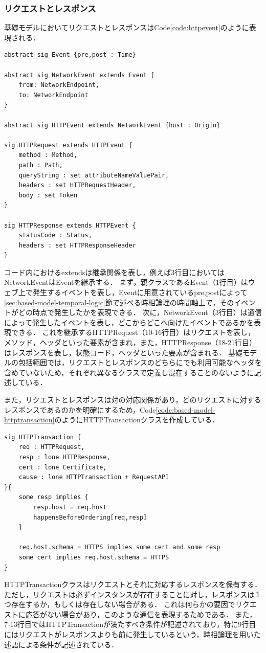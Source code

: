 \documentclass[12pt,a4paper]{jbook}
\begin{document}
\subsubsection{リクエストとレスポンス}
基礎モデルにおいてリクエストとレスポンスはCode\ref{code:httpevent}のように表現される．
\begin{lstlisting}[caption=リクエストとレスポンスを表現するクラス, label=code:httpevent]
abstract sig Event {pre,post : Time}

abstract sig NetworkEvent extends Event {
	from: NetworkEndpoint,
	to: NetworkEndpoint
}

abstract sig HTTPEvent extends NetworkEvent {host : Origin}

sig HTTPRequest extends HTTPEvent { 
	method : Method,
	path : Path,
	queryString : set attributeNameValuePair,
	headers : set HTTPRequestHeader,
	body : set Token
}

sig HTTPResponse extends HTTPEvent {
	statusCode : Status,
	headers : set HTTPResponseHeader
}
\end{lstlisting}
コード内におけるextendsは継承関係を表し，例えば3行目においてはNetworkEventはEventを継承する．
まず，親クラスであるEvent（1行目）はウェブ上で発生するイベントを表し，Eventに用意されているpre,postによって\ref{sec:based-model-temporal-logic}節で述べる時相論理の時間軸上で，そのイベントがどの時点で発生したかを表現できる．
次に，NetworkEvent（3行目）は通信によって発生したイベントを表し，どこからどこへ向けたイベントであるかを表現できる．
これを継承するHTTPRequest（10-16行目）はリクエストを表し，メソッド，ヘッダといった要素が含まれ，また，HTTPResponse（18-21行目）はレスポンスを表し，状態コード，ヘッダといった要素が含まれる．
基礎モデルの包括範囲では，リクエストとレスポンスのどちらにでも利用可能なヘッダを含めていないため，それぞれ異なるクラスで定義し混在することのないように記述している．

また，リクエストとレスポンスは対の対応関係があり，どのリクエストに対するレスポンスであるのかを明確にするため，Code\ref{code:based-model-httptransaction}のようにHTTPTransactionクラスを作成している．
\begin{lstlisting}[caption=リクエストとレスポンスの対応関係, label=code:based-model-httptransaction]
sig HTTPTransaction {
	req : HTTPRequest,
	resp : lone HTTPResponse,
	cert : lone Certificate,
	cause : lone HTTPTransaction + RequestAPI
}{
	some resp implies {
		resp.host = req.host
		happensBeforeOrdering[req,resp]
	}

	req.host.schema = HTTPS implies some cert and some resp
	some cert implies req.host.schema = HTTPS
}
\end{lstlisting}
HTTPTransactionクラスはリクエストとそれに対応するレスポンスを保有する．
ただし，リクエストは必ずインスタンスが存在することに対し，レスポンスは１つ存在するか，もしくは存在しない場合がある．
これは何らかの要因でリクエストに応答がない場合があり，このような通信を表現するためである．
また，7-13行目ではHTTPTransactionが満たすべき条件が記述されており，特に9行目にはリクエストがレスポンスよりも前に発生しているという，時相論理を用いた述語による条件が記述されている．
\end{document}

